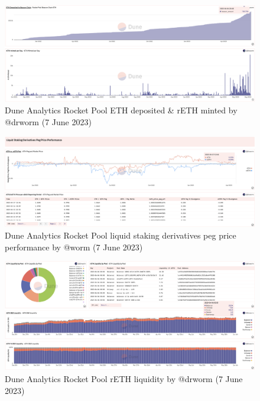 \documentclass[UTF8]{article}
\begin{document}
\begin{figure}[htbp]
\begin{center}
\includegraphics[width=\linewidth]{images/rocketdrworm3}
\caption{Dune Analytics Rocket Pool ETH deposited \& rETH minted by @drworm  (7 June 2023)}
\label{fig:rocketdrworm3}
\end{center}
\end{figure}


\begin{figure}[htbp]
\begin{center}
\includegraphics[width=\linewidth]{images/rocketdrworm4}
\caption{Dune Analytics Rocket Pool liquid staking derivatives peg price performance by @worm  (7 June 2023)}
\label{fig:rocketdrworm4}
\end{center}
\end{figure}

\begin{figure}[htbp]
\begin{center}
\includegraphics[width=\linewidth]{images/rocketdrworm5}
\caption{Dune Analytics Rocket Pool rETH liquidity by @drworm  (7 June 2023)}
\label{fig:rocketdrworm5}
\end{center}
\end{figure}
\end{document}
